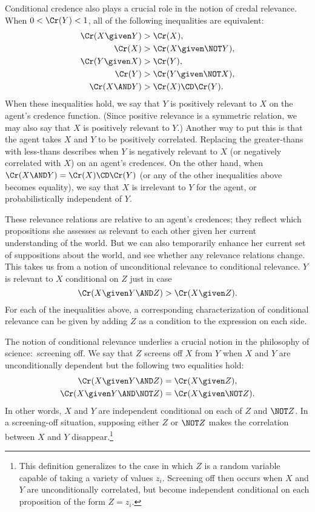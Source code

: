 Conditional credence also plays a crucial role in the notion of credal relevance. When $0<\Cr(Y)<1$, all of the following inequalities are equivalent:
\begin{align}
\Cr(X \given Y) &> \Cr(X),\\
\Cr(X) &> \Cr(X \given \NOT Y),\\
\Cr(Y \given X) &> \Cr(Y),\\
\Cr(Y) &> \Cr(Y \given \NOT X),\\
\Cr(X \AND Y) &> \Cr(X) \CD \Cr(Y).
\end{align} 
When these inequalities hold, we say that $Y$ is positively relevant to $X$ on the agent's credence function. (Since positive relevance is a symmetric relation, we may also say that $X$ is positively relevant to $Y$.) Another way to put this is that the agent takes $X$ and $Y$ to be positively correlated. Replacing the greater-thans with less-thans describes when $Y$ is negatively relevant to $X$ (or negatively correlated with $X$) on an agent's credences. On the other hand, when $\Cr(X \AND Y)=\Cr(X) \CD \Cr(Y)$ (or any of the other inequalities above becomes equality), we say that $X$ is irrelevant to $Y$ for the agent, or probabilistically independent of $Y$.

These relevance relations are relative to an agent's credences; they reflect which propositions she assesses as relevant to each other given her current understanding of the world. But we can also temporarily enhance her current set of suppositions about the world, and see whether any relevance relations change. This takes us from a notion of unconditional relevance to conditional relevance. $Y$ is relevant to $X$ conditional on $Z$ just in case
\begin{equation}
\Cr(X \given Y \AND Z)>\Cr(X \given Z).
\end{equation}
For each of the inequalities above, a corresponding characterization of conditional relevance can be given by adding $Z$ as a condition to the expression on each side.

The notion of conditional relevance underlies a crucial notion in the philosophy of science:\ screening off. We say that $Z$ screens off $X$ from $Y$ when $X$ and $Y$ are unconditionally dependent but the following two equalities hold:
\begin{align}
\Cr(X \given Y \AND Z)&=\Cr(X \given Z),\\
\Cr(X \given Y \AND \NOT Z)&=\Cr(X \given \NOT Z).
\end{align}
In other words, $X$ and $Y$ are independent conditional on each of $Z$ and $\NOT Z$. In a screening-off situation, supposing either $Z$ or $\NOT Z$ makes the correlation between $X$ and $Y$ disappear.\footnote
{This definition generalizes to the case in which $Z$ is a random variable capable of taking a variety of values $z_i$. Screening off then occurs when $X$ and $Y$ are unconditionally correlated, but become independent conditional on each proposition of the form $Z=z_i$.}


